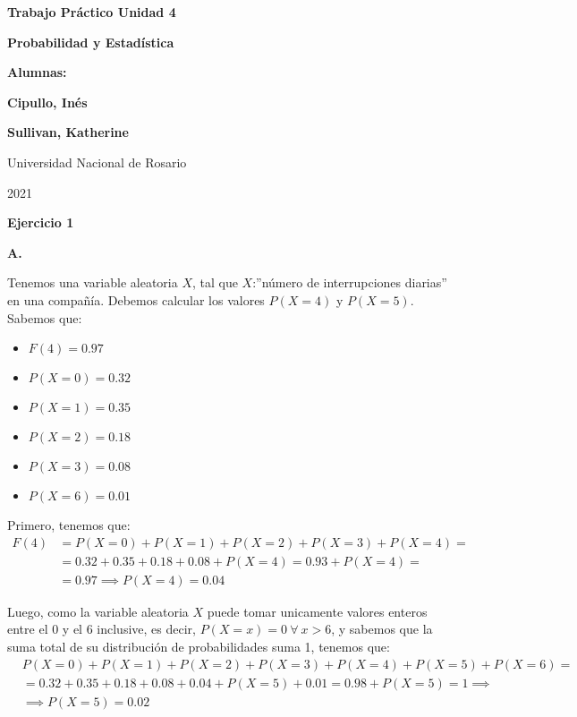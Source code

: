 \documentclass[11pt]{article}
\begin{document}
\begin{titlepage}
    \begin{center}
        \vfill
        \vfill
            \vspace{0.7cm}
            \noindent\textbf{\Huge Trabajo Pr\'actico Unidad 4}\par
            \noindent\textbf{\Huge Probabilidad y Estad\'istica}\par
            \vspace{.5cm}
        \vfill
        \noindent \textbf{\huge Alumnas:}\par
        \vspace{.5cm}
        \noindent \textbf{\Large Cipullo, In\'es}\par
        \noindent \textbf{\Large Sullivan, Katherine}\par
 
        \vfill
        \large Universidad Nacional de Rosario \par
        \noindent\large 2021
    \end{center}
\end{titlepage}
\par


\textbf{Ejercicio 1}

\textbf{A.} \par
Tenemos una variable aleatoria $X$, tal que $X$:”número de interrupciones diarias” en una compañía. 
Debemos calcular los valores $P(X=4)$ y $P(X=5)$. Sabemos que:  

\begin{itemize}
    \item $F(4) = 0.97$
    \item $P(X=0) = 0.32$ 
    \item $P(X=1) = 0.35$
    \item $P(X=2) = 0.18$
    \item $P(X=3) = 0.08$
    \item $P(X=6) = 0.01$
\end{itemize}

Primero, tenemos que: 
\begin{align*}
    F(4)& = P(X=0) + P(X=1) + P(X=2) + P(X=3) + P(X=4) =\\
        & = 0.32 + 0.35 + 0.18 + 0.08 + P(X=4) = 0.93 + P(X=4) =\\
        & = 0.97 \implies P(X=4) = 0.04
\end{align*}

Luego, como la variable aleatoria $X$ puede tomar unicamente valores enteros entre el 0 y el 6 inclusive, es decir, $P(X=x) = 0\ \forall\ x > 6$, y sabemos que la suma total de su distribución de probabilidades suma 1, tenemos que:
\begin{align*}
    &P(X=0) + P(X=1) + P(X=2) + P(X=3) + P(X=4) + P(X=5) + P(X=6) = \\
    &= 0.32 + 0.35 + 0.18 + 0.08 + 0.04 + P(X=5) + 0.01 = 0.98 + P(X=5) = 1 \implies \\
    &\implies P(X=5) = 0.02 
\end{align*}
\end{document}
